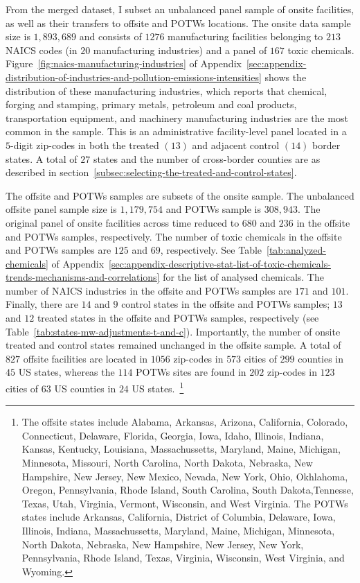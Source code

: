 \documentclass{C:/Users/david/OneDrive/Documents/ULMS/PhD/Thesis/chapter3/src/climate_change/latex/Economic_Journal/OUP-EJ}
\begin{document}
    From the merged dataset, I subset an unbalanced panel sample of onsite facilities, as well as their transfers to offsite and POTWs locations. The onsite data sample size is $1,893,689$ and consists of $1276$ manufacturing facilities belonging to $213$ NAICS codes (in $20$ manufacturing industries) and a panel of $167$ toxic chemicals. Figure~\ref{fig:naics-manufacturing-industries} of Appendix~\ref{sec:appendix-distribution-of-industries-and-pollution-emissions-intensities} shows the distribution of these manufacturing industries, which reports that chemical, forging and stamping, primary metals, petroleum and coal products, transportation equipment, and machinery manufacturing industries are the most common in the sample. This is an administrative facility-level panel located in a $5$-digit zip-codes in both the treated $(13)$ and adjacent control $(14)$ border states. A total of $27$ states and the number of cross-border counties are as described in section~\ref{subsec:selecting-the-treated-and-control-states}.

    The offsite and POTWs samples are subsets of the onsite sample. The unbalanced offsite panel sample size is $1,179,754$ and POTWs sample is $308,943$. The original panel of onsite facilities across time reduced to $680$ and $236$ in the offsite and POTWs samples, respectively. The number of toxic chemicals in the offsite and POTWs samples are $125$ and $69$, respectively. See Table~\ref{tab:analyzed-chemicals} of Appendix~\ref{sec:appendix-descriptive-stat-list-of-toxic-chemicals-trends-mechanisms-and-correlations} for the list of analysed chemicals. The number of NAICS industries in the offsite and POTWs samples are $171$ and $101$. Finally, there are $14$ and $9$ control states in the offsite and POTWs samples; $13$ and $12$ treated states in the offsite and POTWs samples, respectively (see Table~\ref{tab:states-mw-adjustments-t-and-c}). Importantly, the number of onsite treated and control states remained unchanged in the offsite sample. A total of $827$ offsite facilities are located in $1056$ zip-codes in $573$ cities of $299$ counties in $45$ US states, whereas the $114$ POTWs sites are found in $202$ zip-codes in $123$ cities of $63$ US counties in $24$ US states.~\footnote{\tiny The offsite states include Alabama, Arkansas, Arizona, California, Colorado, Connecticut, Delaware, Florida, Georgia, Iowa, Idaho, Illinois, Indiana, Kansas, Kentucky, Louisiana, Massachussetts, Maryland, Maine, Michigan, Minnesota, Missouri, North Carolina, North Dakota, Nebraska, New Hampshire, New Jersey, New Mexico, Nevada, New York, Ohio, Okhlahoma, Oregon, Pennsylvania, Rhode Island, South Carolina, South Dakota,Tennesse, Texas, Utah, Virginia, Vermont, Wisconsin, and West Virginia. The POTWs states include Arkansas, California, District of Columbia, Delaware, Iowa, Illinois, Indiana, Massachussetts, Maryland, Maine, Michigan, Minnesota, North Dakota, Nebraska, New Hampshire, New Jersey, New York, Pennsylvania, Rhode Island, Texas, Virginia, Wisconsin, West Virginia, and Wyoming.}
\end{document}
